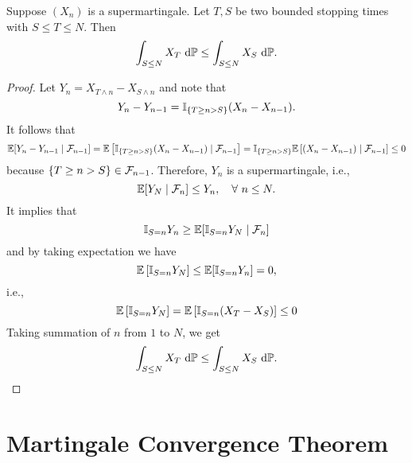 \begin{lem}\label{lem:two_stopping_times_integral}
    Suppose $(X_n)$ is a supermartingale. Let $T,S$ be two bounded stopping times with $S \leq T \leq N$. Then
    \begin{equation*}
        \int_{S \leq N} X_T ~\mathrm{d}\mathbb{P} \leq  \int_{S \leq N} X_S ~\mathrm{d}\mathbb{P}.
    \end{equation*}
\end{lem}
\begin{proof}
    Let $Y_n = X_{T \wedge n} - X_{S \wedge n}$ and note that
    \begin{equation*}
        Y_n - Y_{n-1} = \mathbb{I}_{\left\{T \geq n > S\right\}}(X_n - X_{n-1}).
    \end{equation*}
    It follows that
    \begin{equation*}
        \mathbb{E}[Y_n - Y_{n-1} \mid \mathcal{F}_{n-1}] = \mathbb{E}\left[  \mathbb{I}_{\left\{T \geq n > S\right\}}(X_n - X_{n-1}) \mid \mathcal{F}_{n-1} \right] = \mathbb{I}_{\left\{T \geq n > S\right\}}\mathbb{E}\left[(X_n - X_{n-1}) \mid \mathcal{F}_{n-1} \right] \leq 0
    \end{equation*}
    because $\left\{T \geq n > S\right\} \in \mathcal{F}_{n-1}$. Therefore, $Y_n$ is a supermartingale, i.e.,
    \begin{equation*}
        \mathbb{E}[Y_N \mid \mathcal{F}_n] \leq Y_n,\quad \forall~ n \leq N.
    \end{equation*}
    It implies that
    \begin{equation*}
        \mathbb{I}_{S = n}Y_n \geq \mathbb{E}[\mathbb{I}_{S = n} Y_N \mid \mathcal{F}_n]
    \end{equation*}
    and by taking expectation we have
    \begin{equation*}
        \mathbb{E}\left[\mathbb{I}_{S = n}Y_N\right] \leq \mathbb{E}[\mathbb{I}_{S = n} Y_n] = 0,
    \end{equation*}
    i.e.,
    \begin{equation*}
        \mathbb{E}\left[\mathbb{I}_{S = n}Y_N\right] = \mathbb{E}\left[\mathbb{I}_{S = n}(X_T - X_S)\right] \leq 0
    \end{equation*}
    Taking summation of $n$ from $1$ to $N$, we get
    \begin{equation*}
        \int_{S \leq N} X_T ~\mathrm{d}\mathbb{P} \leq  \int_{S \leq N} X_S ~\mathrm{d}\mathbb{P}. \qedhere
    \end{equation*}
\end{proof}

\section{Martingale Convergence Theorem}

